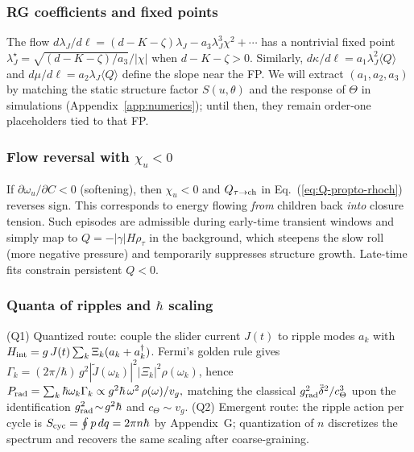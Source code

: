 \documentclass[11pt]{article}
\begin{document}
\subsubsection{RG coefficients and fixed points}\label{subsub:rg-fp}
The flow
\(
d\lambda_J/d\ell = (d-K-\zeta)\lambda_J - a_3 \lambda_J^3 \chi^2+\cdots
\)
has a nontrivial fixed point $\lambda_J^\star=\sqrt{(d-K-\zeta)/a_3}/|\chi|$ when $d-K-\zeta>0$.
Similarly, $d\kappa/d\ell=a_1\lambda_J^2\langle Q\rangle$ and $d\mu/d\ell=a_2\lambda_J\langle Q\rangle$ define the slope near the FP.
We will extract $(a_1,a_2,a_3)$ by matching the static structure factor $S(u,\theta)$ and the response of $\Theta$ in simulations (Appendix~\ref{app:numerics}); until then, they remain order‑one placeholders tied to that FP.

\subsubsection{Flow reversal with $\chi_u<0$}\label{subsub:flow-reversal}
If $\partial\omega_u/\partial C<0$ (softening), then $\chi_u<0$ and $Q_{\tau\to{\rm ch}}$ in Eq.~(\ref{eq:Q-propto-rhoch}) reverses sign.
This corresponds to energy flowing \emph{from} children back \emph{into} closure tension.
Such episodes are admissible during early-time transient windows and simply map to $Q=-|\gamma| H \rho_\tau$ in the background, which steepens the slow roll (more negative pressure) and temporarily suppresses structure growth. Late-time fits constrain persistent $Q<0$.

\subsubsection{Quanta of ripples and $\hbar$ scaling}\label{subsub:hbar-scaling}
(Q1) Quantized route: couple the slider current $J(t)$ to ripple modes $a_k$ with $H_{\rm int}=g\,J(t)\sum_k \Xi_k (a_k+a_k^\dagger)$.
Fermi's golden rule gives $\Gamma_{k}=(2\pi/\hbar)\,g^2 |\tilde J(\omega_k)|^2 |\Xi_k|^2 \rho(\omega_k)$, hence
\(
P_{\rm rad}=\sum_k \hbar \omega_k \Gamma_k \propto g^2 \hbar\,\omega^2\,\rho(\omega)/v_g,
\)
matching the classical $g_{\rm rad}^2 \ddot\delta^2/c_\Theta^3$ upon the identification $g_{\rm rad}^2\!\sim\!g^2\hbar$ and $c_\Theta\!\sim\!v_g$.
(Q2) Emergent route: the ripple action per cycle is $S_{\rm cyc}=\oint p\,dq = 2\pi n \hbar$ by Appendix~G; quantization of $n$ discretizes the spectrum and recovers the same scaling after coarse-graining.
\end{document}
